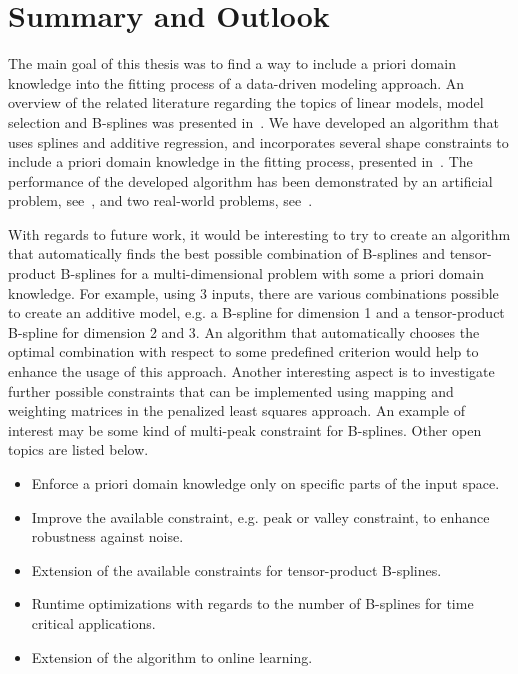 \chapter{Summary and Outlook} \label{cha:summary}

The main goal of this thesis was to find a way to include a priori domain knowledge into the fitting process of a data-driven modeling approach. An overview of the related literature regarding the topics of linear models, model selection and B-splines was presented in~. We have developed an algorithm that uses splines and additive regression, and incorporates several shape constraints to include a priori domain knowledge in the fitting process, presented in~. The performance of the developed algorithm has been demonstrated by an artificial problem, see~, and two real-world problems, see~.

With regards to future work, it would be interesting to try to create an algorithm that automatically finds the best possible combination of B-splines and tensor-product B-splines for a multi-dimensional problem with some a priori domain knowledge. For example, using 3 inputs, there are various combinations possible to create an additive model, e.g. a B-spline for dimension 1 and a tensor-product B-spline for dimension 2 and 3. An algorithm that automatically chooses the optimal combination with respect to some predefined criterion would help to enhance the usage of this approach. Another interesting aspect is to investigate further possible constraints that can be implemented using mapping and weighting matrices in the penalized least squares approach. An example of interest may be some kind of multi-peak constraint for B-splines. Other open topics are listed below.

\begin{itemize}
	\item Enforce a priori domain knowledge only on specific parts of the input space.
	\item Improve the available constraint, e.g. peak or valley constraint, to enhance robustness against noise.
	\item Extension of the available constraints for tensor-product B-splines.
	\item Runtime optimizations with regards to the number of B-splines for time critical applications.
	\item Extension of the algorithm to online learning. 
\end{itemize}